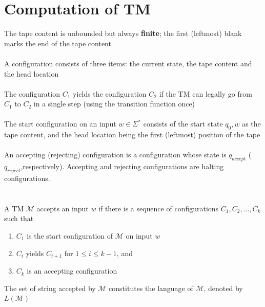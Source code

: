 \documentclass{article}[18pt]
\begin{document}
\section{Computation of TM}
The tape content is unbounded but always \textbf{finite}; the first (leftmost) blank marks the end of the tape content\\
\\
A configuration consists of three items: the current state, the tape content and the head location\\
\\
The configuration $C_1$ yields the configuration $C_2$ if the TM can legally go from $C_1$ to $C_2$ in a single step (using the transition function once)\\
\\
The start configuration on an input $w\in \Sigma^*$ consists of the start state $q_0,w$ as the tape content, and the head location being the first (leftmost) position of the tape\\
\\
An accepting (rejecting) configuration is a configuration whose state is $q_{accept}$ ($q_{reject}$,respectively). Accepting and rejecting configurations are halting configurations.\\
\\
\\
A TM $\mathscr{M}$ accepts an input $w$ if there is a sequence of configurations $C_1,C_2,...,C_k$ such that
\begin{enumerate}
	\item $C_1$ is the start configuration of $\mathscr{M}$ on input $w$
	\item $C_i$ yields $C_{i+1}$ for $1\leqslant i\leqslant k-1$, and
	\item $C_k$ is an accepting configuration
\end{enumerate}
The set of string accepted by $\mathscr{M}$ constitutes the language of $\mathscr{M}$, denoted by $L(\mathscr{M})$
\end{document}
